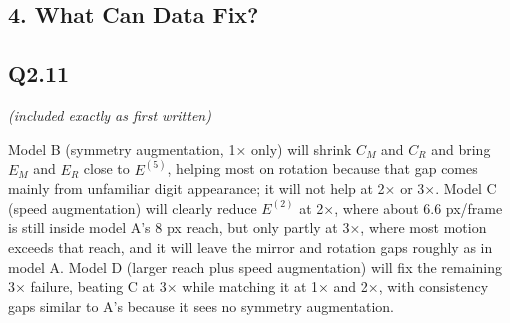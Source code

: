 \documentclass[11pt]{article}
\begin{document}
\newpage
\subsection*{4. What Can Data Fix?}
\subsection*{Q2.11}
\textit{(included exactly as first written)}

Model B (symmetry augmentation, 1× only) will shrink \(C_M\) and \(C_R\) and bring \(E_M\) and \(E_R\) close to \(E^{(5)}\), helping most on rotation because that gap comes mainly from unfamiliar digit appearance; it will not help at 2× or 3×. Model C (speed augmentation) will clearly reduce \(E^{(2)}\) at 2×, where about 6.6 px/frame is still inside model A's 8 px reach, but only partly at 3×, where most motion exceeds that reach, and it will leave the mirror and rotation gaps roughly as in model A. Model D (larger reach plus speed augmentation) will fix the remaining 3× failure, beating C at 3× while matching it at 1× and 2×, with consistency gaps similar to A's because it sees no symmetry augmentation.
\end{document}
